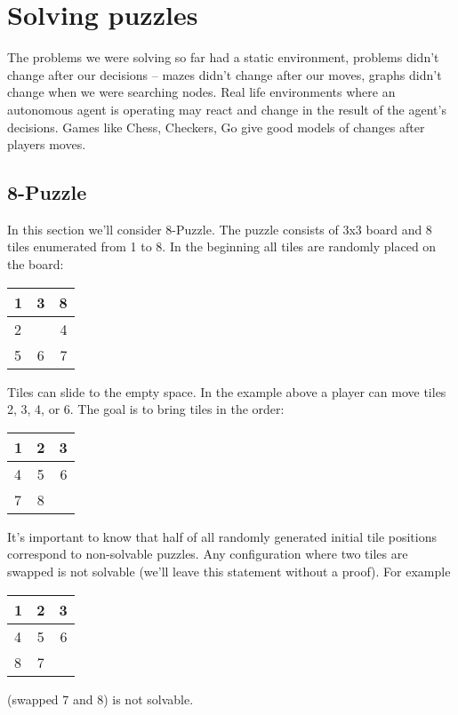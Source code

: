 \chapter{Solving puzzles}

The problems we were solving so far had a static environment,
problems didn't change after our decisions -- mazes didn't
change after our moves, graphs didn't change when we were 
searching nodes. Real life environments where an autonomous 
agent is operating may react and change in the result of 
the agent's decisions. Games like Chess, Checkers, Go give
good models of changes after players moves.  

\section{8-Puzzle}

In this section we'll consider 8-Puzzle. The puzzle consists of
3x3 board and 8 tiles enumerated from 1 to 8. In the beginning 
all tiles are randomly placed on the board:

\begin{center}
\begin{tabular}{ | l | c | r | }
    \hline
    1 & 3 & 8 \\ \hline
    2 &   & 4 \\ \hline
    5 & 6 & 7 \\
    \hline
  \end{tabular}
\end{center}
Tiles can slide to the empty space. In the example above
a player can move tiles 2, 3, 4, or 6. The goal is to bring tiles
in the order:

\begin{center}
\begin{tabular}{ | l | c | r | }
    \hline
    1 & 2 & 3 \\ \hline
    4 & 5 & 6 \\ \hline
    7 & 8 &   \\
    \hline
  \end{tabular}
\end{center}
It's important to know that half of all randomly generated
initial tile positions correspond to non-solvable puzzles.
Any configuration where two tiles are swapped is not solvable 
(we'll leave this statement without a proof). For example

\begin{center}
\begin{tabular}{ | l | c | r | }
    \hline
    1 & 2 & 3 \\ \hline
    4 & 5 & 6 \\ \hline
    8 & 7 &   \\
    \hline
  \end{tabular}
\end{center}
(swapped 7 and 8) is not solvable. 

